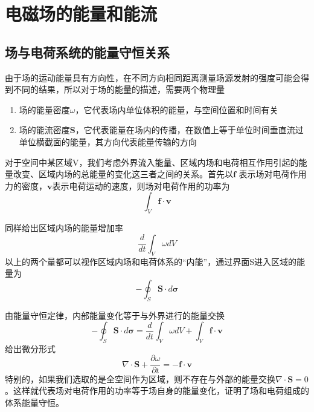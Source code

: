 	\section{电磁场的能量和能流}
		\subsection{场与电荷系统的能量守恒关系}
			由于场的运动能量具有方向性，在不同方向相同距离测量场源发射的强度可能会得到不同的结果，所以对于场的能量的描述，需要两个物理量
				\begin{enumerate}
					\item 场的能量密度$\omega$，它代表场内单位体积的能量，与空间位置和时间有关
					\item 场的能流密度$\boldsymbol{S}$，它代表能量在场内的传播，在数值上等于单位时间垂直流过单位横截面的能量，其方向代表能量传输的方向
				\end{enumerate}
			
			对于空间中某区域V，我们考虑外界流入能量、区域内场和电荷相互作用引起的能量改变、区域内场的总能量的变化这三者之间的关系。首先以$\boldsymbol{f}$	表示场对电荷作用力的密度，$\boldsymbol{v}$表示电荷运动的速度，则场对电荷作用的功率为
				\begin{equation*}
					\int_V \boldsymbol{f} \cdot \boldsymbol{v} 
				\end{equation*}
			
			同样给出区域内场的能量增加率
				\begin{equation*}
					\frac{d}{dt}\int_V \omega dV
				\end{equation*}
			以上的两个量都可以视作区域内场和电荷体系的“内能”，通过界面S进入区域的能量为
				\begin{equation*}
					-\oint_S \boldsymbol{S} \cdot d \boldsymbol{\sigma}
				\end{equation*}
			
			由能量守恒定律，内部能量变化等于与外界进行的能量交换
				\begin{equation}
					-\oint_S \boldsymbol{S} \cdot d \boldsymbol{\sigma} = \frac{d}{dt}\int_V \omega dV +\int_V \boldsymbol{f} \cdot \boldsymbol{v} 
				\end{equation}
			给出微分形式
				\begin{equation}
					\label{eq.1_68}
					\nabla \cdot \boldsymbol{S}+\frac{\partial \omega}{\partial t}= -\boldsymbol{f} \cdot	\boldsymbol{v}
				\end{equation}
			特别的，如果我们选取的是全空间作为区域，则不存在与外部的能量交换$\nabla \cdot \boldsymbol{S}=0$。这样就代表场对电荷作用的功率等于场自身的能量变化，证明了场和电荷组成的体系能量守恒。

